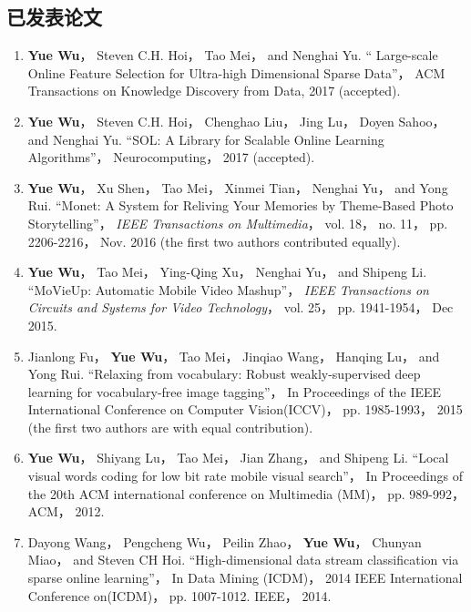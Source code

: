\begin{publications}

    \section*{已发表论文}

    \begin{enumerate}
        \item \textbf{Yue Wu}， Steven C.H. Hoi， Tao Mei， and Nenghai Yu. ``
            Large-scale Online Feature Selection for Ultra-high Dimensional Sparse
            Data''， ACM Transactions on Knowledge Discovery from Data, 2017 (accepted).
        \item \textbf{Yue Wu}， Steven C.H. Hoi， Chenghao Liu， Jing Lu， Doyen Sahoo，
            and Nenghai Yu. “SOL: A Library for Scalable Online Learning
            Algorithms”， Neurocomputing， 2017 (accepted).
        \item \textbf{Yue Wu}， Xu Shen， Tao Mei， Xinmei Tian， Nenghai Yu， and Yong
            Rui. ``Monet: A System for Reliving Your Memories by Theme-Based Photo
            Storytelling''， \emph{IEEE Transactions on Multimedia}， vol. 18， no.
            11， pp. 2206-2216， Nov. 2016 (the first two authors contributed equally).
        \item \textbf{Yue Wu}， Tao Mei， Ying-Qing Xu， Nenghai Yu， and Shipeng Li.
            ``MoVieUp: Automatic Mobile Video Mashup''， \emph{IEEE Transactions on
            Circuits and Systems for Video Technology}， vol. 25， pp. 1941-1954， Dec
            2015.
        \item Jianlong Fu， \textbf{Yue Wu}， Tao Mei， Jinqiao Wang， Hanqing Lu， and
            Yong Rui. ``Relaxing from vocabulary: Robust weakly-supervised deep
            learning for vocabulary-free image tagging''， In Proceedings of the
            IEEE International Conference on Computer Vision(ICCV)， pp. 1985-1993，
            2015 (the first two authors are with equal contribution).
        \item \textbf{Yue Wu}， Shiyang Lu， Tao Mei， Jian Zhang， and Shipeng Li. ``Local visual
            words coding for low bit rate mobile visual search''， In Proceedings of
            the 20th ACM international conference on Multimedia (MM)， pp.  989-992，  ACM， 2012.
        \item Dayong Wang， Pengcheng Wu， Peilin Zhao， \textbf{Yue Wu}， Chunyan Miao， and
            Steven CH Hoi. ``High-dimensional data stream classification via sparse
            online learning''， In Data Mining (ICDM)， 2014 IEEE International
            Conference on(ICDM)， pp. 1007-1012. IEEE， 2014.
    \end{enumerate}

\end{publications}

